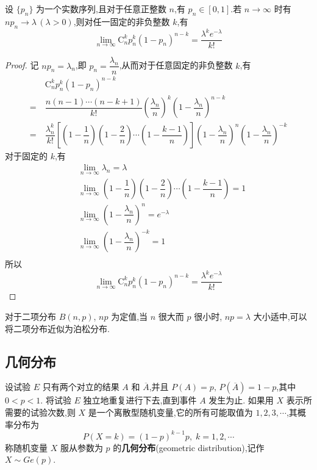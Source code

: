 \begin{theorem}[][泊松定理]
    \indent 设 $\{ p_n \}$ 为一个实数序列,且对于任意正整数 $n$,有 $p_n \in [0,1]$.若 $n \to \infty$ 时有 $n p_n \to \lambda \, (\lambda > 0)$,则对任一固定的非负整数 $k$,有
    $$
    \lim_{n\to\infty} \mathrm{C}_n^k p_n^k (1-p_n)^{n-k} = \dfrac{\lambda^k e^{-\lambda}}{k!}
    $$
\end{theorem}

\begin{proof}
    记 $n p_n=\lambda_n$,即 $p_n=\dfrac{\lambda_n}{n}$,从而对于任意固定的非负整数 $k$,有
    $$
    \begin{aligned}
        & \mathrm{C}_n^k p_n^k (1-p_n)^{n-k} \\
        =\ & \dfrac{n(n-1) \cdots (n-k+1)}{k!} \left( \dfrac{\lambda_n}{n} \right)^k \left( 1-\dfrac{\lambda_n}{n} \right)^{n-k} \\
        =\ & \dfrac{\lambda_n^k}{k!} \left[ \left( 1-\dfrac{1}{n} \right) \left( 1-\dfrac{2}{n} \right) \cdots \left( 1-\dfrac{k-1}{n} \right) \right] \left( 1-\dfrac{\lambda_n}{n} \right)^n \left( 1-\dfrac{\lambda_n}{n} \right)^{-k}
    \end{aligned}
    $$
    对于固定的 $k$,有
    $$
    \begin{aligned}
        & \lim_{n \to \infty} \lambda_n = \lambda \\
        & \lim_{n \to \infty} \left( 1-\dfrac{1}{n} \right) \left( 1-\dfrac{2}{n} \right) \cdots \left( 1-\dfrac{k-1}{n} \right) = 1 \\
        & \lim_{n \to \infty} \left( 1-\dfrac{\lambda_n}{n} \right)^n = e^{-\lambda} \\
        & \lim_{n \to \infty} \left( 1-\dfrac{\lambda_n}{n} \right)^{-k} = 1 \\
    \end{aligned}
    $$
    所以
    $$
    \lim_{n\to\infty} \mathrm{C}_n^k p_n^k (1-p_n)^{n-k} = \dfrac{\lambda^k e^{-\lambda}}{k!}
    $$
\end{proof}

对于二项分布 $B(n,p)$, $np$ 为定值,当 $n$ 很大而 $p$ 很小时, $np = \lambda$ 大小适中,可以将二项分布近似为泊松分布.

\subsection{几何分布}

设试验 $E$ 只有两个对立的结果 $A$ 和 $\overline{A}$,并且 $P(A)=p, \, P(\overline{A})=1-p$,其中 $0<p<1$. 将试验 $E$ 独立地重复进行下去,直到事件 $A$ 发生为止. 如果用 $X$ 表示所需要的试验次数,则 $X$ 是一个离散型随机变量,它的所有可能取值为 $1,2,3,\cdots$,其概率分布为
$$
P(X=k) = (1-p)^{k-1} p, \; k=1,2,\cdots
$$
称随机变量 $X$ 服从参数为 $p$ 的\textbf{几何分布}(geometric distribution),记作 $X \sim Ge(p)$.


